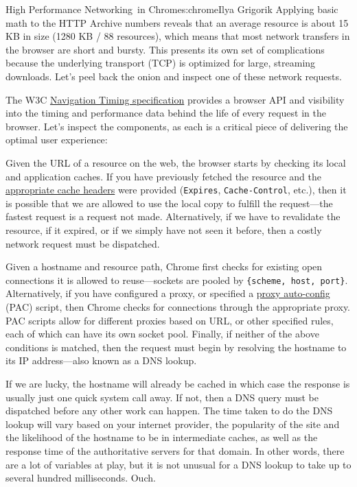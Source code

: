 \begin{aosachapter}{High Performance Networking~in Chrome}{s:chrome}{Ilya Grigorik}
Applying basic math to the HTTP Archive numbers reveals that an average
resource is about 15 KB in size (1280 KB / 88 resources), which means
that most network transfers in the browser are short and bursty. This
presents its own set of complications because the underlying transport
(TCP) is optimized for large, streaming downloads. Let's peel back the
onion and inspect one of these network requests.


The W3C \href{http://www.w3.org/TR/navigation-timing/}{Navigation Timing
specification} provides a browser API and visibility into the timing and
performance data behind the life of every request in the browser. Let's
inspect the components, as each is a critical piece of delivering the
optimal user experience:


Given the URL of a resource on the web, the browser starts by checking
its local and application caches. If you have previously fetched the
resource and the
\href{https://developers.google.com/speed/docs/best-practices/caching}{appropriate
cache headers} were provided (\texttt{Expires}, \texttt{Cache-Control},
etc.), then it is possible that we are allowed to use the local copy to
fulfill the request---the fastest request is a request not made.
Alternatively, if we have to revalidate the resource, if it expired, or
if we simply have not seen it before, then a costly network request must
be dispatched.

Given a hostname and resource path, Chrome first checks for existing
open connections it is allowed to reuse---sockets are pooled by
\texttt{\{scheme, host, port\}}. Alternatively, if you have configured a
proxy, or specified a
\href{http://en.wikipedia.org/wiki/Proxy_auto-config}{proxy auto-config}
(PAC) script, then Chrome checks for connections through the appropriate
proxy. PAC scripts allow for different proxies based on URL, or other
specified rules, each of which can have its own socket pool. Finally, if
neither of the above conditions is matched, then the request must begin
by resolving the hostname to its IP address---also known as a DNS
lookup.

If we are lucky, the hostname will already be cached in which case the
response is usually just one quick system call away. If not, then a DNS
query must be dispatched before any other work can happen. The time
taken to do the DNS lookup will vary based on your internet provider,
the popularity of the site and the likelihood of the hostname to be in
intermediate caches, as well as the response time of the authoritative
servers for that domain. In other words, there are a lot of variables at
play, but it is not unusual for a DNS lookup to take up to several
hundred milliseconds. Ouch.


\end{aosachapter}
